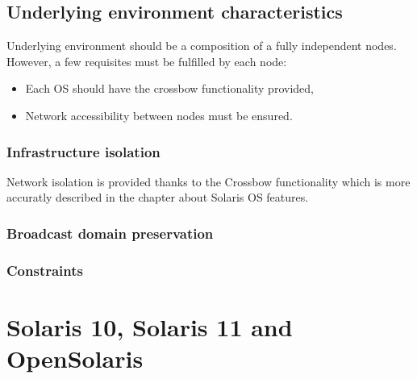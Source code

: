 \documentclass[11pt]{book}
\begin{document}
    \section{Underlying environment characteristics}
	
		Underlying environment should be a composition of a fully independent nodes. However, a few requisites
		must be fulfilled by each node:
		
		\begin{itemize}
			\item{Each OS should have the crossbow functionality provided, }
			\item{Network accessibility between nodes must be ensured. }
		\end{itemize}
		

	

      \subsection{Infrastructure isolation}
	  
		Network isolation is provided thanks to the Crossbow functionality which is more accuratly described in the chapter
		about Solaris OS features. 
		

      \subsection{Broadcast domain preservation}

	  
		

      \subsection{Constraints}


  \chapter{Solaris 10, Solaris 11 and OpenSolaris}
  
\end{document}
